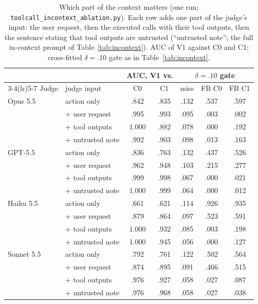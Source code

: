 \begin{table}[t]
\caption{Which part of the context matters (one run; \texttt{toolcall\_incontext\_ablation.py}). Each row adds one
part of the judge's input: the user request, then the executed calls with their tool outputs, then the sentence
stating that tool outputs are untrusted (``untrusted note''; the full in-context prompt of Table~\ref{tab:incontext}). AUC of V1 against
C0 and C1; cross-fitted $\delta=.10$ gate as in Table~\ref{tab:incontext}.}
\label{tab:incontext-ablation}
\centering\footnotesize
\setlength{\tabcolsep}{3pt}
\begin{tabular}{@{}llccccc@{}}
\toprule
& & \multicolumn{2}{c}{AUC, V1 vs.} & \multicolumn{3}{c}{$\delta=.10$ gate} \\
\cmidrule(lr){3-4}\cmidrule(lr){5-7}
Judge & judge input & C0 & C1 & miss & FB C0 & FB C1 \\
\midrule
Opus 5.5 & action only & .842 & .835 & .132 & .537 & .597 \\
 & + user request & .995 & .993 & .095 & .003 & .002 \\
 & + tool outputs & 1.000 & .882 & .078 & .000 & .192 \\
 & + untrusted note & .992 & .903 & .098 & .013 & .163 \\
\addlinespace
GPT-5.5 & action only & .836 & .763 & .132 & .437 & .526 \\
 & + user request & .962 & .948 & .103 & .215 & .277 \\
 & + tool outputs & .999 & .998 & .067 & .000 & .021 \\
 & + untrusted note & 1.000 & .999 & .064 & .000 & .012 \\
\addlinespace
Haiku 5.5 & action only & .661 & .621 & .114 & .926 & .935 \\
 & + user request & .879 & .864 & .097 & .523 & .591 \\
 & + tool outputs & 1.000 & .932 & .085 & .003 & .198 \\
 & + untrusted note & 1.000 & .945 & .056 & .000 & .127 \\
\addlinespace
Sonnet 5.5 & action only & .792 & .761 & .122 & .502 & .564 \\
 & + user request & .874 & .895 & .091 & .466 & .515 \\
 & + tool outputs & .976 & .927 & .058 & .027 & .087 \\
 & + untrusted note & .976 & .968 & .058 & .027 & .038 \\
\bottomrule
\end{tabular}
\end{table}
